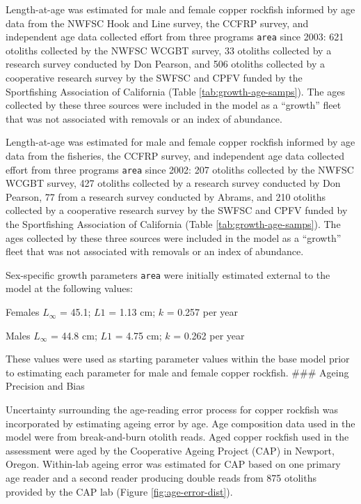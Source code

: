 \documentclass[11pt,
  english,
  letterpaper,
]{article}
\begin{document}
Length-at-age was estimated for male and female copper rockfish informed by age data from the NWFSC Hook and Line survey, the CCFRP survey, and independent age data collected effort from three programs \texttt{area} since 2003: 621 otoliths collected by the NWFSC WCGBT survey, 33 otoliths collected by a research survey conducted by Don Pearson, and 506 otoliths collected by a cooperative research survey by the SWFSC and CPFV funded by the Sportfishing Association of California (Table \ref{tab:growth-age-samps}). The ages collected by these three sources were included in the model as a ``growth'' fleet that was not associated with removals or an index of abundance.

Length-at-age was estimated for male and female copper rockfish informed by age data from the fisheries, the CCFRP survey, and independent age data collected effort from three programs \texttt{area} since 2002: 207 otoliths collected by the NWFSC WCGBT survey, 427 otoliths collected by a research survey conducted by Don Pearson, 77 from a research survey conducted by Abrams, and 210 otoliths collected by a cooperative research survey by the SWFSC and CPFV funded by the Sportfishing Association of California (Table \ref{tab:growth-age-samps}). The ages collected by these three sources were included in the model as a ``growth'' fleet that was not associated with removals or an index of abundance.

Sex-specific growth parameters \texttt{area} were initially estimated external to the model at the following values:

\begin{centering}

Females $L_{\infty}$ = 45.1; $L1$ = 1.13 cm; $k$ = 0.257 per year

Males $L_{\infty}$ = 44.8 cm; $L1$ = 4.75 cm; $k$ = 0.262 per year

\end{centering}

\vspace{0.50cm}

These values were used as starting parameter values within the base model prior to estimating each parameter for male and female copper rockfish. \#\#\# Ageing Precision and Bias

Uncertainty surrounding the age-reading error process for copper rockfish was incorporated by estimating ageing error by age. Age composition data used in the model were from break-and-burn otolith reads. Aged copper rockfish used in the assessment were aged by the Cooperative Ageing Project (CAP) in Newport, Oregon. Within-lab ageing error was estimated for CAP based on one primary age reader and a second reader producing double reads from 875 otoliths provided by the CAP lab (Figure \ref{fig:age-error-dist}).
\end{document}
